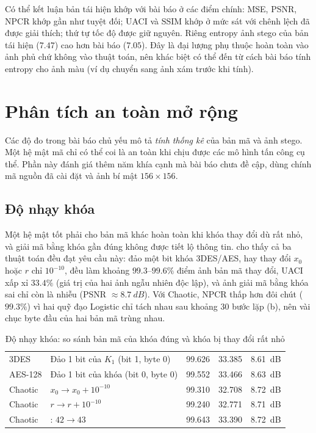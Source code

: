 Có thể kết luận bản tái hiện khớp với bài báo ở các điểm chính: MSE, PSNR, NPCR khớp gần như tuyệt
đối; UACI và SSIM khớp ở mức sát với chênh lệch đã được giải thích; thứ tự tốc độ được giữ nguyên.
Riêng entropy ảnh stego của bản tái hiện ($7.47$) cao hơn bài báo ($7.05$). Đây là đại lượng phụ
thuộc hoàn toàn vào ảnh phủ chứ không vào thuật toán, nên khác biệt có thể đến từ cách bài báo tính
entropy cho ảnh màu (ví dụ chuyển sang ảnh xám trước khi tính).

\section{Phân tích an toàn mở rộng}
\label{sec:antoan-morong}

Các độ đo trong bài báo chủ yếu mô tả \emph{tính thống kê} của bản mã và ảnh stego. Một hệ mật mã
chỉ có thể coi là an toàn khi chịu được các mô hình tấn công cụ thể. Phần này đánh giá thêm năm khía
cạnh mà bài báo chưa đề cập, dùng chính mã nguồn đã cài đặt và ảnh bí mật $156\times156$.

\subsection{Độ nhạy khóa}

Một hệ mật tốt phải cho bản mã khác hoàn toàn khi khóa thay đổi dù rất nhỏ, và giải mã bằng khóa
gần đúng không được tiết lộ thông tin.  cho thấy cả ba thuật toán đều đạt yêu cầu
này: đảo một bit khóa 3DES/AES, hay thay đổi $x_0$ hoặc $r$ chỉ $10^{-10}$, đều làm khoảng $99.3$--$99.6\%$
điểm ảnh bản mã thay đổi, UACI xấp xỉ $33.4\%$ (giá trị của hai ảnh ngẫu nhiên độc lập), và ảnh giải
mã bằng khóa sai chỉ còn là nhiễu (PSNR $\approx \SI{8.7}{dB}$). Với Chaotic, NPCR thấp hơn đôi chút
($99.3\%$) vì hai quỹ đạo Logistic chỉ tách nhau sau khoảng 30 bước lặp (b), nên
vài chục byte đầu của hai bản mã trùng nhau.

\begin{table}[H]
\centering
\caption{Độ nhạy khóa: so sánh bản mã của khóa đúng và khóa bị thay đổi rất nhỏ}
\label{tab:keysens}
\small
\begin{tabularx}{\linewidth}{@{}lLrrr@{}}
\toprule
{} &  &  &  & \\
\midrule
3DES    & Đảo 1 bit của $K_1$ (bit 1, byte 0) & 99.626 & 33.385 & \SI{8.61}{dB}\\
AES-128 & Đảo 1 bit của khóa (bit 0, byte 0)  & 99.552 & 33.466 & \SI{8.63}{dB}\\
Chaotic & $x_0 \to x_0 + 10^{-10}$            & 99.310 & 32.708 & \SI{8.72}{dB}\\
Chaotic & $r \to r + 10^{-10}$                & 99.240 & 32.771 & \SI{8.71}{dB}\\
Chaotic & : $42 \to 43$       & 99.643 & 33.390 & \SI{8.72}{dB}\\
\bottomrule
\end{tabularx}
\end{table}

